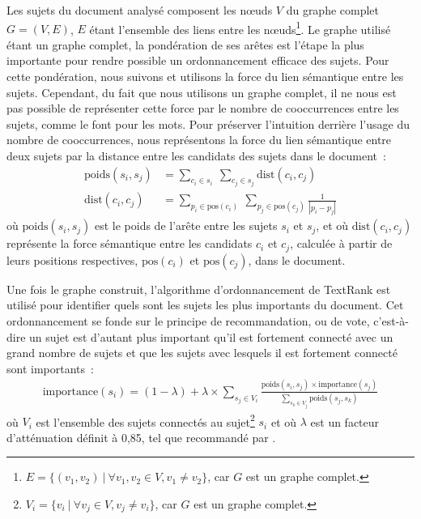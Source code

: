     Les sujets du document analysé composent les n\oe{}uds $V$ du graphe complet
    $G = (V, E)$, $E$ étant l'ensemble des liens entre les
    n\oe{}uds\footnote{$E = \{(v_1, v_2)\ |\ \forall{v_1, v_2 \in V}, v_1 \neq v_2\}$,
    car $G$ est un graphe complet.}. Le graphe utilisé étant un graphe complet,
    la pondération de ses arêtes est l'étape la plus importante pour rendre
    possible un ordonnancement efficace des sujets. Pour cette pondération, nous
    suivons  et utilisons la force du lien sémantique
    entre les sujets. Cependant, du fait que nous utilisons un graphe complet,
    il ne nous est pas possible de représenter cette force par le nombre de
    cooccurrences entre les sujets, comme le font 
    pour les mots. Pour préserver l'intuition derrière l'usage du nombre de
    cooccurrences, nous représentons la force du lien sémantique entre deux
    sujets par la distance entre les candidats des sujets dans le document~:
    \begin{align}
      \text{poids}(s_i, s_j) &= \sum_{c_i \in s_i}\ \sum_{c_j \in s_j} \text{dist}(c_i, c_j) \label{math:ponderation}\\
      \text{dist}(c_i, c_j) &= \sum_{p_i \in \text{pos}(c_i)}\ \sum_{p_j \in \text{pos}(c_j)} \frac{1}{|p_i - p_j|} \label{math:distance}
    \end{align}
    où $\text{poids}(s_i, s_j)$ est le poids de l'arête entre les sujets $s_i$
    et $s_j$, et où $\text{dist}(c_i, c_j)$ représente la force sémantique entre
    les candidats $c_i$ et $c_j$, calculée à partir de leurs positions
    respectives, $\text{pos}(c_i)$ et $\text{pos}(c_j)$, dans le document.

    Une fois le graphe construit, l'algorithme d'ordonnancement de TextRank est
    utilisé pour identifier quels sont les sujets les plus importants du
    document. Cet ordonnancement se fonde sur le principe de recommandation,
    ou de vote, c'est-à-dire un sujet est d'autant plus important qu'il est
    fortement connecté avec un grand nombre de sujets et que les sujets avec
    lesquels il est fortement connecté sont importants~:
    \begin{align}
      \text{importance}(s_i) = (1 - \lambda) + \lambda \times \sum_{s_j \in V_i} \frac{\text{poids}(s_i, s_j) \times \text{importance}(s_j)}{\sum_{s_k \in V_j} \text{poids}(s_j, s_k)} \label{math:textrank}
    \end{align}
    où $V_i$ est l'ensemble des sujets connectés au
    sujet\footnote{$V_i = \{v_i\ |\ \forall{v_j \in V}, v_j \neq v_i\}$, car $G$
    est un graphe complet.} $s_i$ et où $\lambda$ est un facteur d'atténuation
    définit à 0,85, tel que recommandé par .

